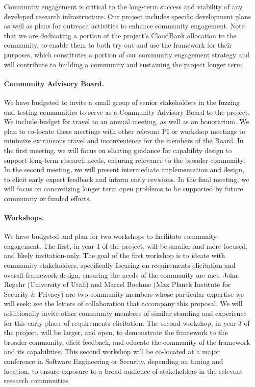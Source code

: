 Community engagement is critical to the long-term success and viability of any
developed research infrastructure.  Our project includes specific development
plans as well as plans for outreach activities to enhance community engagement.  
Note that we are dedicating a portion of the project's CloudBank allocation to
the community, to enable them to both try out and use the framework for their
purposes, which constitutes a portion of our community engagement strategy and
will contribute to building a community and sustaining the project longer term. 

\paragraph{Community Advisory Board.} We have budgeted to invite a small group
of senior stakeholders in the fuzzing and testing communities to serve as a
Community Advisory Board to the project.  We include budget for travel to an
annual meeting, as well as an honorarium. We plan to co-locate these meetings with
other relevant PI or workshop meetings to minimize extraneous travel and
inconvenience for the members of the Board.  In the first meeting, we will focus
on eliciting guidance for capability design to support long-term research needs,
ensuring relevance to the broader community.  In the second meeting, we will
present intermediate implementation and design, to elicit early expert feedback
and inform early revisions.  In the final meeting, we will focus on concretizing
longer term open problems to be supported by future community or
funded efforts.

\paragraph{Workshops.}  We have budgeted and plan for two workshops to
facilitate community engagement.  The first, in year 1 of the project, will be
smaller and more focused, and likely invitation-only. The goal of the first workshop is
to ideate with community stakeholders, specifically focusing on requirements
elicitation and overall framework design, ensuring the needs of the community
are met.  John Regehr (University of Utah) and Marcel Boehme (Max Planck
Institute for Security \& Privacy) are two community members whose particular
expertise we will seek; see the letters of collaboration that accompany this
proposal.  We will additionally invite other community members of similar
standing and experience for this early phase of requirements elicitation.   The
second workshop, in year 3 of the project, will be larger, and open, to demonstrate the
framework to the broader community, elicit feedback, and educate the community
of the framework and its capabilities.  This second workshop will be co-located
at a major conference in Software Engineering or Security, depending on timing
and location, to ensure exposure to a broad audience of stakeholders in the
relevant research communities. 

